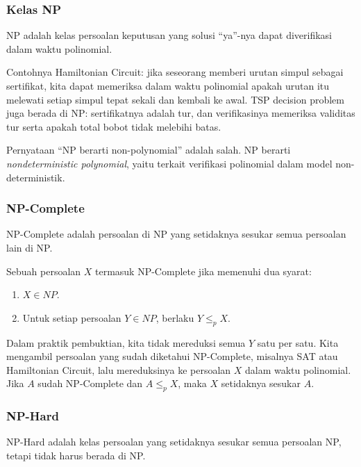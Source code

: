 \subsubsection{Kelas NP}

\begin{jawab}
NP adalah kelas persoalan keputusan yang solusi ``ya''-nya dapat diverifikasi dalam waktu polinomial.
\end{jawab}

Contohnya Hamiltonian Circuit: jika seseorang memberi urutan simpul sebagai sertifikat, kita dapat memeriksa dalam waktu polinomial apakah urutan itu melewati setiap simpul tepat sekali dan kembali ke awal. TSP decision problem juga berada di NP: sertifikatnya adalah tur, dan verifikasinya memeriksa validitas tur serta apakah total bobot tidak melebihi batas.

Pernyataan ``NP berarti non-polynomial'' adalah salah. NP berarti \textit{nondeterministic polynomial}, yaitu terkait verifikasi polinomial dalam model non-deterministik.

\subsubsection{NP-Complete}

\begin{jawab}
NP-Complete adalah persoalan di NP yang setidaknya sesukar semua persoalan lain di NP.
\end{jawab}

Sebuah persoalan $X$ termasuk NP-Complete jika memenuhi dua syarat:
\begin{enumerate}
    \item $X\in NP$.
    \item Untuk setiap persoalan $Y\in NP$, berlaku $Y\le_p X$.
\end{enumerate}

Dalam praktik pembuktian, kita tidak mereduksi semua $Y$ satu per satu. Kita mengambil persoalan yang sudah diketahui NP-Complete, misalnya SAT atau Hamiltonian Circuit, lalu mereduksinya ke persoalan $X$ dalam waktu polinomial. Jika $A$ sudah NP-Complete dan $A\le_p X$, maka $X$ setidaknya sesukar $A$.

\subsubsection{NP-Hard}

\begin{jawab}
NP-Hard adalah kelas persoalan yang setidaknya sesukar semua persoalan NP, tetapi tidak harus berada di NP.
\end{jawab}

